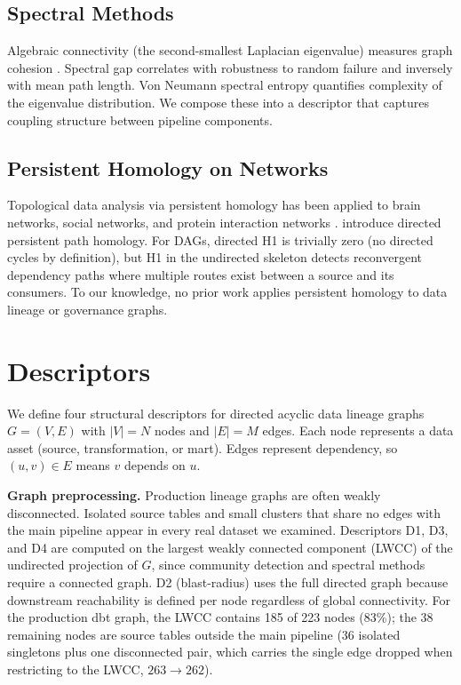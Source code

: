 \documentclass[11pt,a4paper]{article}
\begin{document}
\subsection{Spectral Methods}

Algebraic connectivity (the second-smallest Laplacian eigenvalue)
measures graph cohesion \citep{fiedler1973}. Spectral gap correlates
with robustness to random failure and inversely with mean path length.
Von Neumann spectral entropy \citep{domenico2016} quantifies complexity
of the eigenvalue distribution. We compose these into a descriptor
that captures coupling structure between pipeline components.

\subsection{Persistent Homology on Networks}

Topological data analysis via persistent homology has been applied to
brain networks, social networks, and protein interaction networks
\citep{otter2017,petri2013}. \citet{chowdhury2018} introduce directed
persistent path homology. For DAGs, directed H1 is trivially zero (no
directed cycles by definition), but H1 in the undirected skeleton
detects reconvergent dependency paths where multiple routes exist
between a source and its consumers. To our knowledge, no prior work
applies persistent homology to data lineage or governance graphs.

\section{Descriptors}

We define four structural descriptors for directed acyclic data
lineage graphs $G = (V, E)$ with $|V| = N$ nodes and $|E| = M$ edges.
Each node represents a data asset (source, transformation, or mart).
Edges represent dependency, so $(u, v) \in E$ means $v$ depends on $u$.

\textbf{Graph preprocessing.} Production lineage graphs are often
weakly disconnected. Isolated source tables and small clusters that
share no edges with the main pipeline appear in every real dataset we
examined. Descriptors D1, D3, and D4 are computed on the largest
weakly connected component (LWCC) of the undirected projection of
$G$, since community detection and spectral methods require a connected
graph. D2 (blast-radius) uses the full directed graph because
downstream reachability is defined per node regardless of global
connectivity. For the production dbt graph, the LWCC contains 185 of
223 nodes (83\%); the 38 remaining nodes are source tables outside the
main pipeline (36 isolated singletons plus one disconnected pair, which
carries the single edge dropped when restricting to the LWCC, $263 \to
262$).
\end{document}
